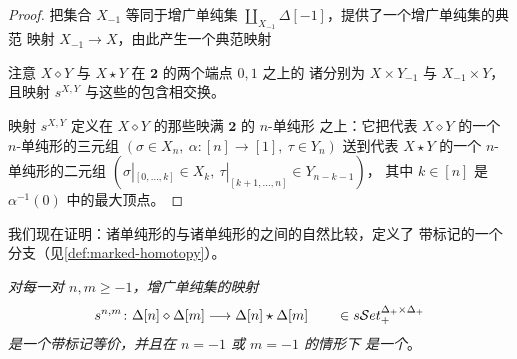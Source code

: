 \begin{proof}
把集合 $X_{-1}$ 等同于增广单纯集
$\coprod_{X_{-1}}\Delta[-1]$，\trYonedaLemma{}提供了一个增广单纯集的典范%
映射 $X_{-1}\to X$，由此产生一个典范映射
\begin{rveq}\label{eq:fat-join-comparison-map}
\end{rveq}
注意 $X\diamond Y$ 与 $X\star Y$ 在 $\mathbf{2}$ 的两个端点 $0,1$ 之上的%
诸\trFiber{}分别为 $X\times Y_{-1}$ 与 $X_{-1}\times Y$，且映射 $s^{X,Y}$%
与这些\trFiber{}的包含相交换。

映射 $s^{X,Y}$ 定义在 $X\diamond Y$ 的那些映满 $\mathbf{2}$ 的 $n$-单纯形%
之上：它把代表 $X\diamond Y$ 的一个 $n$-单纯形的三元组%
$(\sigma\in X_{n},\ \alpha\colon[n]\to[1],\ \tau\in Y_{n})$ 送到代表%
$X\star Y$ 的一个 $n$-单纯形的二元组
$(\sigma|_{[0,\dots,k]}\in X_{k},\ \tau|_{[k+1,\dots,n]}\in Y_{n-k-1})$，
其中 $k\in[n]$ 是 $\alpha^{-1}(0)$ 中的最大顶点。
\end{proof}

我们现在证明：诸单纯形的\trFatJoin{}与诸单纯形的\trJoin{}之间的自然比较，定义了%
带标记\trHomotopyEquivalence{}的一个分支（见\cref{def:marked-homotopy}）。
\begin{proposition}\label{prop:comparison-marked-homotopy-retract}
\emph{对每一对 $n,m\ge-1$，增广单纯集的映射
\begin{equation*}
s^{n,m}\colon\Delta[n]\diamond\Delta[m]\longrightarrow\Delta[n]\star\Delta[m]
\qquad\in s\mathcal{S}et_{+}^{\Delta_{+}\times\Delta_{+}}
\end{equation*}
是一个带标记\trHomotopy{}\trRetract{}等价，并且在 $n=-1$ 或 $m=-1$ 的情形下
是一个\trIsomorphism}。
\end{proposition}

